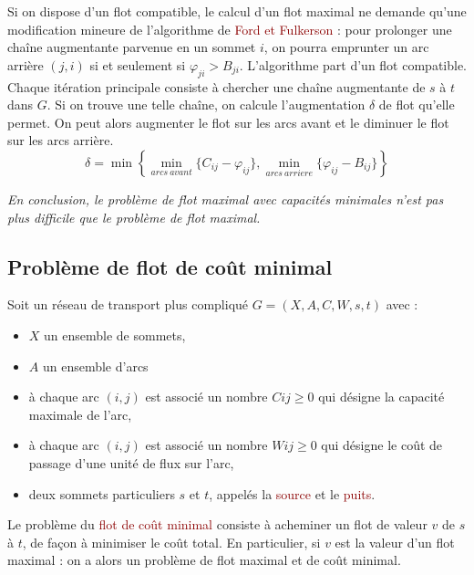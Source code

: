 \documentclass{article}
\newcommand{\red}[1]{\textcolor{darkred}{#1}}
\begin{document}
Si on dispose d’un flot compatible, le calcul d’un flot maximal ne demande qu’une modification mineure de l’algorithme de \red{Ford et Fulkerson} : pour prolonger une chaîne 
augmentante parvenue en un sommet $i$, on pourra emprunter un arc arrière $(j,i)$ si et seulement si $\varphi_{ji} > B_{ji}$. L’algorithme part d’un flot compatible. Chaque
itération principale consiste à chercher une chaîne augmentante de $s$ à $t$ dans $G$. Si on trouve une telle chaîne, on calcule l’augmentation $\delta$ de flot qu’elle permet. 
On peut alors augmenter le flot sur les arcs avant et le diminuer le flot sur les arcs arrière.
$$ \delta = \min{\left\{  \min_{arcs\ avant}{\{ C_{ij} -\varphi_{ij} \}}, \min_{arcs\ arriere}{\{ \varphi_{ij} -B_{ij}\}} \right\}}$$

\noindent\textit{En conclusion, le problème de flot maximal avec capacités minimales n’est pas plus difficile que le problème de flot maximal.}

\subsection{Problème de flot de coût minimal}

Soit un réseau de transport plus compliqué $G=(X,A,C,W,s,t)$ avec :
\begin{itemize}
\item $X$ un ensemble de sommets,
\item $A$ un ensemble d’arcs
\item à chaque arc $(i,j)$ est associé un nombre $Cij  \geq 0$ qui désigne la capacité maximale de l’arc,
\item à chaque arc $(i,j)$ est associé un nombre $Wij \geq 0$ qui désigne le coût de passage d’une unité de flux sur l’arc,
\item deux sommets particuliers $s$ et $t$, appelés la \red{source} et le \red{puits}.
\end{itemize}
Le problème du \red{flot de coût minimal} consiste à acheminer un flot de valeur $v$ de $s$ à $t$, de façon à minimiser le coût total. En particulier, si $v$ est la valeur d’un flot 
maximal : on a alors un problème de flot maximal et de coût minimal. \\
\end{document}
